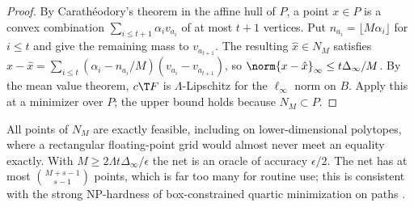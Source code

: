 \begin{proof}
By Carath\'eodory's theorem in the affine hull of $P$, a point $x\in P$ is a
convex combination $\sum_{i\le t+1}\alpha_iv_{a_i}$ of at most $t+1$ vertices.
Put $n_{a_i}=\lfloor M\alpha_i\rfloor$ for $i\le t$ and give the remaining mass to
$v_{a_{t+1}}$. The resulting $\hat x\in N_M$ satisfies
$x-\hat x=\sum_{i\le t}(\alpha_i-n_{a_i}/M)(v_{a_i}-v_{a_{t+1}})$, so
$\norm{x-\hat x}_\infty\le t\Delta_\infty/M$. By the mean value theorem, $c\T F$ is
$\Lambda$-Lipschitz for the $\ell_\infty$ norm on $B$. Apply this at a minimizer
over $P$; the upper bound holds because $N_M\subset P$.
\end{proof}

All points of $N_M$ are exactly feasible, including on lower-dimensional
polytopes, where a rectangular floating-point grid would almost never meet an
equality exactly. With $M\ge2\Lambda t\Delta_\infty/\epsilon$ the net is an oracle
of accuracy $\epsilon/2$. The net has at most $\binom{M+s-1}{s-1}$ points, which is
far too many for routine use; this is consistent with the strong NP-hardness
of box-constrained quartic minimization on paths \citep{DelPiaKhajavirad2026}.


